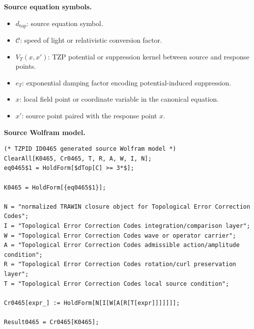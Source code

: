 \begin{minipage}[t]{0.49\linewidth}
\begingroup
\small
\raggedright
\textbf{Source equation symbols.}\par
\begin{itemize}[leftmargin=1.35em,itemsep=1pt,topsep=1pt,parsep=0pt]
    \item $d_{\mathrm{top}}$: source equation symbol.
    \item $\mathcal{C}$: speed of light or relativistic conversion factor.
    \item $V_{T}(x,x')$: TZP potential or suppression kernel between source and response points.
    \item $e_T$: exponential damping factor encoding potential-induced suppression.
    \item $x$: local field point or coordinate variable in the canonical equation.
    \item $x'$: source point paired with the response point $x$.
\end{itemize}
\endgroup
\end{minipage}\hfill
\begin{minipage}[t]{0.47\linewidth}
\begingroup
\scriptsize
\raggedright
\textbf{Source Wolfram model.}\par
\begin{Verbatim}[fontsize=\tiny,breaklines=true,breakanywhere=true]
(* TZPID ID0465 generated source Wolfram model *)
ClearAll[K0465, Cr0465, T, R, A, W, I, N];
eq0465$1 = HoldForm[$dTop[C] >= 3*$];

K0465 = HoldForm[{eq0465$1}];

N = "normalized TRAWIN closure object for Topological Error Correction Codes";
I = "Topological Error Correction Codes integration/comparison layer";
W = "Topological Error Correction Codes wave or operator carrier";
A = "Topological Error Correction Codes admissible action/amplitude condition";
R = "Topological Error Correction Codes rotation/curl preservation layer";
T = "Topological Error Correction Codes local source condition";

Cr0465[expr_] := HoldForm[N[I[W[A[R[T[expr]]]]]]];

Result0465 = Cr0465[K0465];
\end{Verbatim}
\endgroup
\end{minipage}

